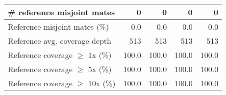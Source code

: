 \documentclass[12pt,a4paper]{article}
\begin{document}
\begin{table}[ht]
\begin{center}
\begin{tabular}{|l*{4}{|r}|}
\# reference misjoint mates & 0 & 0 & 0 & 0 \\ \hline
Reference misjoint mates (\%) & 0.0 & 0.0 & 0.0 & 0.0 \\ \hline
Reference avg. coverage depth & 513 & 513 & 513 & 513 \\ \hline
Reference coverage $\geq$ 1x (\%) & 100.0 & 100.0 & 100.0 & 100.0 \\ \hline
Reference coverage $\geq$ 5x (\%) & 100.0 & 100.0 & 100.0 & 100.0 \\ \hline
Reference coverage $\geq$ 10x (\%) & 100.0 & 100.0 & 100.0 & 100.0 \\ \hline
\end{tabular}
\end{center}
\end{table}
\end{document}
